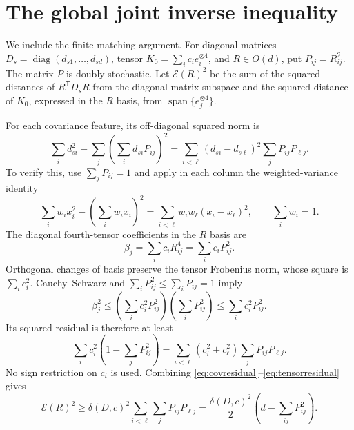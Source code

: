 \documentclass[11pt,a4paper]{article}
\numberwithin{equation}{section}
\newcommand{\T}{\mathsf T}
\DeclareMathOperator{\diag}{diag}
\begin{document}
\section{The global joint inverse inequality}\label{sec:inverse}
We include the finite matching argument. For diagonal matrices
\(D_s=\diag(d_{s1},\ldots,d_{sd})\), tensor
\(K_0=\sum_i c_ie_i^{\otimes4}\), and \(R\in O(d)\), put
\(P_{ij}=R_{ij}^2\). The matrix \(P\) is doubly stochastic.
Let \(\mathcal E(R)^2\) be the sum of the squared distances of
\(R^\T D_sR\) from the diagonal matrix subspace and the squared distance
of \(K_0\), expressed in the \(R\) basis, from
\(\operatorname{span}\{e_j^{\otimes4}\}\).

For each covariance feature, its off-diagonal squared norm is
\begin{equation}\label{eq:covresidual}
 \sum_i d_{si}^2-\sum_j\left(\sum_i d_{si}P_{ij}\right)^2
 =\sum_{i<\ell}(d_{si}-d_{s\ell})^2\sum_jP_{ij}P_{\ell j}.
\end{equation}
To verify this, use \(\sum_jP_{ij}=1\) and apply in each column the
weighted-variance identity
\[
 \sum_iw_ix_i^2-\left(\sum_iw_ix_i\right)^2
 =\sum_{i<\ell}w_iw_\ell(x_i-x_\ell)^2,\qquad \sum_iw_i=1.
\]
The diagonal fourth-tensor coefficients in the \(R\) basis are
\[
 \beta_j=\sum_i c_iR_{ij}^4=\sum_i c_iP_{ij}^2.
\]
Orthogonal changes of basis preserve the tensor Frobenius norm, whose
square is \(\sum_ic_i^2\). Cauchy--Schwarz and
\(\sum_iP_{ij}^2\le\sum_iP_{ij}=1\) imply
\[
 \beta_j^2
 \le\left(\sum_ic_i^2P_{ij}^2\right)\left(\sum_iP_{ij}^2\right)
 \le\sum_ic_i^2P_{ij}^2.
\]
Its squared residual is therefore at least
\begin{equation}\label{eq:tensorresidual}
 \sum_ic_i^2\left(1-\sum_jP_{ij}^2\right)
 =\sum_{i<\ell}(c_i^2+c_\ell^2)\sum_jP_{ij}P_{\ell j}.
\end{equation}
No sign restriction on \(c_i\) is used. Combining
\eqref{eq:covresidual}--\eqref{eq:tensorresidual} gives
\begin{equation}\label{eq:mixingdefect}
 \mathcal E(R)^2
 \ge\delta(D,c)^2\sum_{i<\ell}\sum_jP_{ij}P_{\ell j}
 =\frac{\delta(D,c)^2}{2}\left(d-\sum_{ij}P_{ij}^2\right).
\end{equation}
\end{document}
